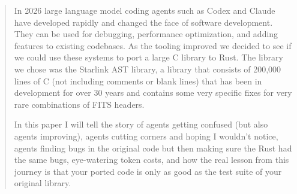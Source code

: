 
\begin{abstract}
In 2026 large language model coding agents such as Codex and Claude have developed rapidly and changed the face of software development. They can be used for debugging, performance optimization, and adding features to existing codebases. As the tooling improved we decided to see if we could use these systems to port a large C library to Rust. The library we chose was the Starlink AST library, a library that consists of 200,000 lines of C (not including comments or blank lines) that has been in development for over 30 years and contains some very specific fixes for very rare combinations of FITS headers.

In this paper I will tell the story of agents getting confused (but also agents improving), agents cutting corners and hoping I wouldn't notice, agents finding bugs in the original code but then making sure the Rust had the same bugs, eye-watering token costs, and how the real lesson from this journey is that your ported code is only as good as the test suite of your original library.
\end{abstract}

